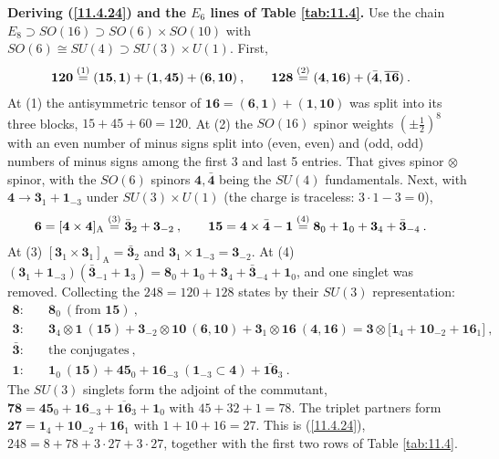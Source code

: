 \begin{tcolorbox}[breakable]
	\begin{remark}
		\textbf{Deriving (\ref{11.4.24}) and the $E_{6}$ lines of Table \ref{tab:11.4}.} Use the chain $E_{8}\supset SO(16)\supset SO(6)\times SO(10)$ with $SO(6)\cong SU(4)\supset SU(3)\times U(1)$. First,
		\begin{align*}
			\mathbf{120}&\overset{(1)}{=}(\mathbf{15},\mathbf{1})+(\mathbf{1},\mathbf{45})+(\mathbf{6},\mathbf{10})\:,\qquad
			\mathbf{128}\overset{(2)}{=}(\mathbf{4},\mathbf{16})+(\bar{\mathbf{4}},\overline{\mathbf{16}})\:.
		\end{align*}
		At (1) the antisymmetric tensor of $\mathbf{16}=(\mathbf{6},\mathbf{1})+(\mathbf{1},\mathbf{10})$ was split into its three blocks, $15+45+60=120$. At (2) the $SO(16)$ spinor weights $(\pm\frac{1}{2})^{8}$ with an even number of minus signs split into (even, even) and (odd, odd) numbers of minus signs among the first 3 and last 5 entries. That gives spinor $\otimes$ spinor, with the $SO(6)$ spinors $\mathbf{4},\bar{\mathbf{4}}$ being the $SU(4)$ fundamentals. Next, with $\mathbf{4}\to\mathbf{3}_{1}+\mathbf{1}_{-3}$ under $SU(3)\times U(1)$ (the charge is traceless: $3\cdot1-3=0$),
		\begin{align*}
			\mathbf{6}=[\mathbf{4}\times\mathbf{4}]_{\text{A}}&\overset{(3)}{=}\bar{\mathbf{3}}_{2}+\mathbf{3}_{-2}\:,\qquad
			\mathbf{15}=\mathbf{4}\times\bar{\mathbf{4}}-\mathbf{1}\overset{(4)}{=}\mathbf{8}_{0}+\mathbf{1}_{0}+\mathbf{3}_{4}+\bar{\mathbf{3}}_{-4}\:.
		\end{align*}
		At (3) $[\mathbf{3}_{1}\times\mathbf{3}_{1}]_{\text{A}}=\bar{\mathbf{3}}_{2}$ and $\mathbf{3}_{1}\times\mathbf{1}_{-3}=\mathbf{3}_{-2}$. At (4) $(\mathbf{3}_{1}+\mathbf{1}_{-3})(\bar{\mathbf{3}}_{-1}+\mathbf{1}_{3})=\mathbf{8}_{0}+\mathbf{1}_{0}+\mathbf{3}_{4}+\bar{\mathbf{3}}_{-4}+\mathbf{1}_{0}$, and one singlet was removed. Collecting the $248=120+128$ states by their $SU(3)$ representation:
		\begin{align*}
			\mathbf{8}:&\quad \mathbf{8}_{0}\ (\text{from }\mathbf{15})\:,\\
			\mathbf{3}:&\quad \mathbf{3}_{4}\otimes\mathbf{1}\ (\mathbf{15})+\mathbf{3}_{-2}\otimes\mathbf{10}\ (\mathbf{6},\mathbf{10})+\mathbf{3}_{1}\otimes\mathbf{16}\ (\mathbf{4},\mathbf{16})
			=\mathbf{3}\otimes\bigl[\mathbf{1}_{4}+\mathbf{10}_{-2}+\mathbf{16}_{1}\bigr]\:,\\
			\bar{\mathbf{3}}:&\quad \text{the conjugates}\:,\\
			\mathbf{1}:&\quad \mathbf{1}_{0}\ (\mathbf{15})+\mathbf{45}_{0}+\mathbf{16}_{-3}\ (\mathbf{1}_{-3}\subset\mathbf{4})+\overline{\mathbf{16}}_{3}\:.
		\end{align*}
		The $SU(3)$ singlets form the adjoint of the commutant, $\mathbf{78}=\mathbf{45}_{0}+\mathbf{16}_{-3}+\overline{\mathbf{16}}_{3}+\mathbf{1}_{0}$ with $45+32+1=78$. The triplet partners form $\mathbf{27}=\mathbf{1}_{4}+\mathbf{10}_{-2}+\mathbf{16}_{1}$ with $1+10+16=27$. This is (\ref{11.4.24}), $248=8+78+3\cdot27+3\cdot27$, together with the first two rows of Table \ref{tab:11.4}.


\end{remark}
\end{tcolorbox}
